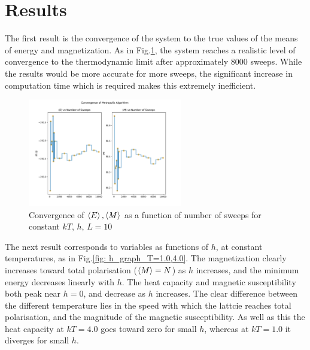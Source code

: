 \documentclass{article}
\theoremstyle{definition}
\theoremstyle{remark}
\begin{document}
\section{Results}
The first result is the convergence of the system to the true values of the means of energy and magnetization. As in Fig.\ref{fig: convergence}, the system reaches a realistic level of convergence to the thermodynamic limit after approximately 8000 sweeps. While the results would be more accurate for more sweeps, the significant increase in computation time which is required makes this extremely inefficient.\\
\begin{figure}
    \centering
    \includegraphics[width=0.6\textwidth]{convergence.pdf}
    \caption{\label{fig: convergence}Convergence of $\braket{E},\braket{M}$ as a function of number of sweeps for constant $kT$, $h$, $L=10$}
\end{figure}
The next result corresponds to variables as functions of $h$, at constant temperatures, as in Fig.\ref{fig: h_graph_T=1.0,4.0}. The magnetization clearly increases toward total polarisation ($\braket{M}=N$) as $h$ increases, and the minimum energy decreases linearly with $h$. The heat capacity and magnetic susceptibility both peak near $h=0$, and decrease as $h$ increases. The clear difference between the different temperature lies in the speed with which the lattcie reaches total polarisation, and the magnitude of the magnetic susceptibility. As well as this the heat capacity at $kT=4.0$ goes toward zero for small $h$, whereas at $kT=1.0$ it diverges for small $h$.\\
\end{document}
